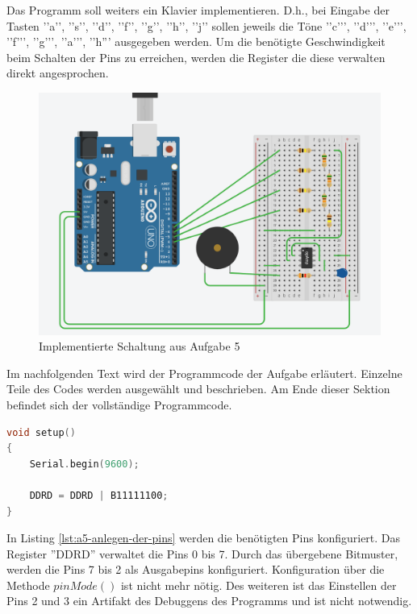 Das Programm soll weiters ein Klavier implementieren.
D.h., bei Eingabe der Tasten ’’a’’, ’’s’’, ’’d’’, ’’f’’, ’’g’’, ’’h’’, ’’j’’ sollen jeweils die Töne ’’c'’’, ’’d'’’, ’’e'’’, ’’f'’’, ’’g'’’, ’’a'’’, ’’h''' ausgegeben werden.
Um die benötigte Geschwindigkeit beim Schalten der Pins zu erreichen, werden die Register die diese verwalten direkt angesprochen.

\begin{figure}[h]
    \centering
    \includegraphics[width=\textwidth]{pictures/a5-praktik.png}
    \caption{Implementierte Schaltung aus Aufgabe 5}
    \label{fig:a5-praktik}
\end{figure}

Im nachfolgenden Text wird der Programmcode der Aufgabe erläutert.
Einzelne Teile des Codes werden ausgewählt und beschrieben.
Am Ende dieser Sektion befindet sich der vollständige Programmcode.

\begin{lstlisting}[language=C,label={lst:a5-anlegen-der-pins}, caption={Anlegen der Pins über Register}]
void setup()
{
    Serial.begin(9600);

    DDRD = DDRD | B11111100;
}
\end{lstlisting}

\newpage

In Listing \ref{lst:a5-anlegen-der-pins} werden die benötigten Pins konfiguriert.
Das Register ''DDRD'' verwaltet die Pins 0 bis 7.
Durch das übergebene Bitmuster, werden die Pins 7 bis 2 als Ausgabepins konfiguriert.
Konfiguration über die Methode $pinMode()$ ist nicht mehr nötig.
Des weiteren ist das Einstellen der Pins 2 und 3 ein Artifakt des Debuggens des Programms und ist nicht notwendig.

